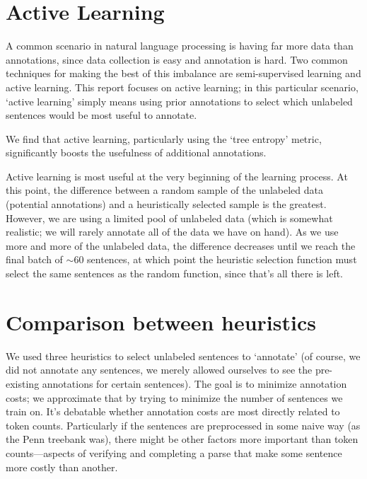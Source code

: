 \documentclass[10pt]{article}\usepackage{graphicx, color}
\begin{document}
\section{Active Learning}

A common scenario in natural language processing is having far more data than annotations, since data collection is easy and annotation is hard.
Two common techniques for making the best of this imbalance are semi-supervised learning and active learning. This report focuses on active learning; in this particular scenario, `active learning' simply means using prior annotations to select which unlabeled sentences would be most useful to annotate.

We find that active learning, particularly using the `tree entropy' metric, significantly boosts the usefulness of additional annotations.

Active learning is most useful at the very beginning of the learning process. At this point, the difference between a random sample of the unlabeled data (potential annotations) and a heuristically selected sample is the greatest. However, we are using a limited pool of unlabeled data (which is somewhat realistic; we will rarely annotate all of the data we have on hand). As we use more and more of the unlabeled data, the difference decreases until we reach the final batch of $\sim 60$ sentences, at which point the heuristic selection function must select the same sentences as the random function, since that's all there is left.

\section{Comparison between heuristics}

We used three heuristics to select unlabeled sentences to `annotate' (of course, we did not annotate any sentences, we merely allowed ourselves to see the pre-existing annotations for certain sentences). The goal is to minimize annotation costs; we approximate that by trying to minimize the number of sentences we train on. It's debatable whether annotation costs are most directly related to token counts. Particularly if the sentences are preprocessed in some naive way (as the Penn treebank was), there might be other factors more important than token counts---aspects of verifying and completing a parse that make some sentence more costly than another.
\end{document}
